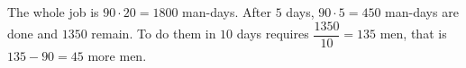The whole job is $90\cdot20=1800$ man-days. After $5$ days, $90\cdot5=450$ man-days are done and $1350$ remain. To do them in $10$ days requires $\dfrac{1350}{10}=135$ men, that is $135-90=\boxed{45}$ more men.
